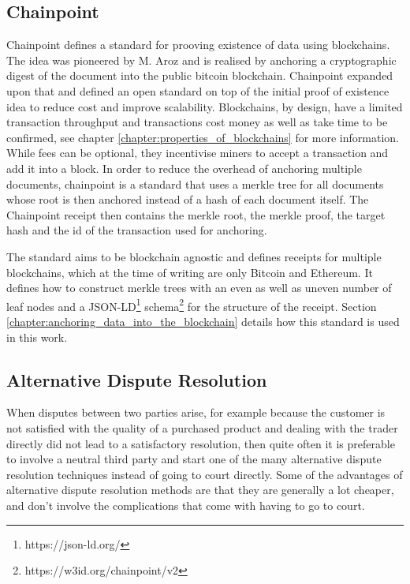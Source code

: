 \documentclass[12pt,msc,a4paper,oneside]{ucl_thesis}
\begin{document}
\subsection{Chainpoint} \label{sec:literature_chainpoint}
Chainpoint defines a standard for prooving existence of data using blockchains. The idea was pioneered by M. Aroz \cite{proof_of_existence} and is realised by anchoring a cryptographic digest of the document into the public bitcoin blockchain. Chainpoint expanded upon that and defined an open standard on top of the initial proof of existence idea to reduce cost and improve scalability.
Blockchains, by design, have a limited transaction throughput and transactions cost money as well as take time to be confirmed, see chapter \ref{chapter:properties_of_blockchains} for more information. While fees can be optional, they incentivise miners to accept a transaction and add it into a block. In order to reduce the overhead of anchoring multiple documents, chainpoint is a standard that uses a merkle tree for all documents whose root is then anchored instead of a hash of each document itself. The Chainpoint receipt then contains the merkle root, the merkle proof, the target hash and the id of the transaction used for anchoring.

The standard aims to be blockchain agnostic and defines receipts for multiple blockchains, which at the time of writing are only Bitcoin and Ethereum. It defines how to construct merkle trees with an even as well as uneven number of leaf nodes and a JSON-LD\footnote{https://json-ld.org/} schema\footnote{https://w3id.org/chainpoint/v2} for the structure of the receipt. Section \ref{chapter:anchoring_data_into_the_blockchain} details how this standard is used in this work.

\subsection{Alternative Dispute Resolution}
When disputes between two parties arise, for example because the customer is not satisfied with the quality of a purchased product and dealing with the trader directly did not lead to a satisfactory resolution, then quite often it is preferable to involve a neutral third party and start one of the many alternative dispute resolution techniques instead of going to court directly. Some of the advantages of alternative dispute resolution methods are that they are generally a lot cheaper, and don't involve the complications that come with having to go to court. \cite{adr_overview:findlaw}
\end{document}
